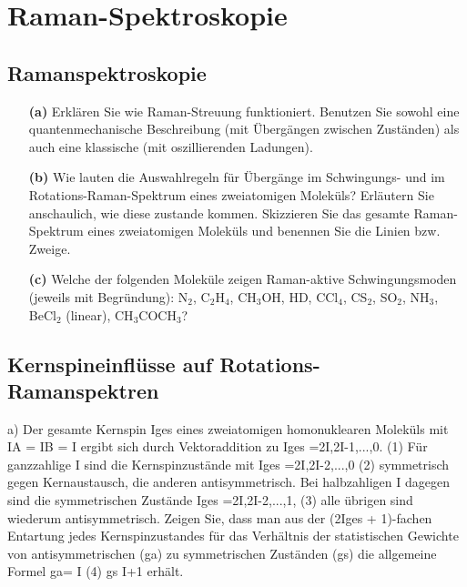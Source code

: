 \renewcommand{\lastmod}{\today}

\chapter{Raman-Spektroskopie}


\section{Ramanspektroskopie}


\begin{itemize}

	\item[\textbf{(a)}] Erklären Sie wie Raman-Streuung funktioniert. Benutzen Sie sowohl eine quantenmechanische Beschreibung (mit Übergängen zwischen Zuständen) als auch eine klassische (mit oszillierenden Ladungen).

	\item[\textbf{(b)}] Wie lauten die Auswahlregeln für Übergänge im Schwingungs- und im Rotations-Raman-Spektrum eines zweiatomigen Moleküls? Erläutern Sie anschaulich, wie diese zustande kommen. Skizzieren Sie das gesamte Raman-Spektrum eines zweiatomigen Moleküls und benennen Sie die Linien bzw. Zweige.

	\item[\textbf{(c)}] Welche der folgenden Moleküle zeigen Raman-aktive Schwingungsmoden (jeweils mit Begründung): N$_2$, C$_2$H$_4$, CH$_3$OH, HD, CCl$_4$, CS$_2$, SO$_2$, NH$_3$, BeCl$_2$ (linear), CH$_3$COCH$_3$?
	
\end{itemize}


\section{Kernspineinflüsse auf Rotations-Ramanspektren}

a) Der gesamte Kernspin Iges eines zweiatomigen homonuklearen Moleküls mit IA = IB = I ergibt sich durch Vektoraddition zu
Iges =2I,2I-1,...,0. (1) Für ganzzahlige I sind die Kernspinzustände mit
Iges =2I,2I-2,...,0 (2) symmetrisch gegen Kernaustausch, die anderen antisymmetrisch. Bei halbzahligen I dagegen
sind die symmetrischen Zustände
Iges =2I,2I-2,...,1, (3)
alle übrigen sind wiederum antisymmetrisch. Zeigen Sie, dass man aus der (2Iges + 1)-fachen Entartung jedes Kernspinzustandes für das Verhältnis der statistischen Gewichte von antisymmetrischen (ga) zu symmetrischen Zuständen (gs) die allgemeine Formel
ga= I (4) gs I+1
erhält.


